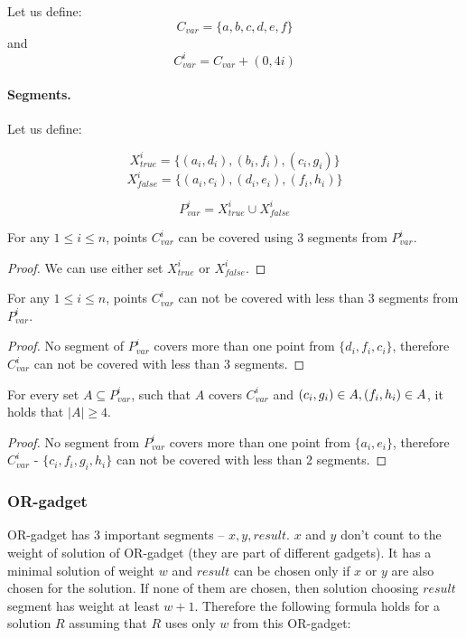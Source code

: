 Let us define: $$C_{var} =  \{a, b, c, d, e, f\}$$
and $$C_{var}^i = C_{var} + (0, 4i)$$


\paragraph{Segments.}

Let us define:

$$X_{true}^i =\{ (a_i, d_i), (b_i, f_i), (c_i, g_i)\}$$
$$X_{false}^i = \{(a_i, c_i), (d_i, e_i), (f_i, h_i)\}$$

$$P_{var}^i = X_{true}^i \cup X_{false}^i$$


\begin{lemma}
\label{choose_variables_solution}
For any $1 \le i \le n$, points $C_{var}^i$
can be covered using 3 segments from $P_{var}^i$.
\end{lemma}

\begin{proof}
We can use either set $X_{true}^i$ or $X_{false}^i$.
\end{proof}

\begin{lemma}
\label{choose_variables_no_less}
For any $1 \le i \le n$, points $C_{var}^i$
can not be covered with less than 3 segments from $P_{var}^i$.
\end{lemma}

\begin{proof}
No segment of $P_{var}^i$ covers more than one point from
$\{d_i, f_i, c_i\}$, therefore $C_{var}^i$ can
not be covered with less than 3 segments.
\end{proof}

\begin{lemma}
\label{choose_variables_both}
For every set $A \subseteq P_{var}^i$, such that $A$ covers $C_{var}^i$
and $(c_i, g_i) \in A, (f_i, h_i) \in A$,
it holds that $|A| \ge 4$.
\end{lemma}
\begin{proof}
No segment from $P_{var}^i$ covers more than one point from
$\{a_i, e_i\}$,
therefore 
$C_{var}^i$ - $\{c_i, f_i, g_i, h_i\}$
can not be covered with less than 2 segments.
\end{proof}


\subsubsection{OR-gadget}

OR-gadget has 3 important segments
-- $x, y, result$. $x$ and $y$ don't count to the weight of solution
of OR-gadget (they are part of different gadgets).
It has a minimal solution of weight $w$
and $result$ can be chosen only if $x$ or $y$ are also chosen
for the solution.
If none of them are chosen, then solution
choosing $result$ segment has weight at least $w+1$.
Therefore the following formula holds for a solution $R$
assuming that $R$ uses only $w$ from this OR-gadget:

